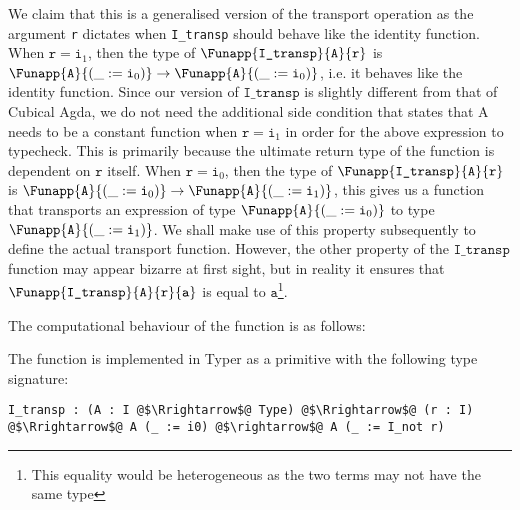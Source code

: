\documentclass[12pt,twoside,maitrise]{dms}
\theoremstyle{definition}
\numberwithin{equation}{section}
\numberwithin{table}{chapter}
\numberwithin{figure}{chapter}
\newcommand\id[1] {\texttt{#1}}
\begin{document}
We claim that this is a generalised version of the transport operation as the
argument \id{r} dictates when \id{I\_transp} should behave like the identity
function. When $\id{r} = \id{i}_1$, then the type of
$\Funapp{\id{I\_transp}}{\id{A}}{\id{r}}$ is $\Funapp{\id{A}}{(\earg{\id{i}_0})}
\rightarrow \Funapp{\id{A}}{(\earg{\id{i}_0})}$, i.e. it behaves like the
identity function. Since our version of $\id{I\_transp}$ is slightly different
from that of Cubical Agda, we do not need the additional side condition that
states that A needs to be a constant function when $\id{r} = \id{i}_1$ in order
for the above expression to typecheck. This is primarily because the ultimate
return type of the function is dependent on $\id{r}$ itself. When $\id{r} =
\id{i}_0$, then the type of $\Funapp{\id{I\_transp}}{\id{A}}{\id{r}}$ is
$\Funapp{\id{A}}{(\earg{\id{i}_0})} \rightarrow
\Funapp{\id{A}}{(\earg{\id{i}_1})}$, this gives us a function that transports an
expression of type $\Funapp{\id{A}}{(\earg{\id{i}_0})}$ to type
$\Funapp{\id{A}}{(\earg{\id{i}_1})}$. We shall make use of this property
subsequently to define the actual transport function. However, the other
property of the $\id{I\_transp}$ function may appear bizarre at first sight, but
in reality it ensures that $\Funapp{\id{I\_transp}}{\id{A}}{\id{r}}{\id{a}}$ is
equal to $\id{a}$\footnote{This equality would be heterogeneous as the two terms
may not have the same type}.

The computational behaviour of the function is as follows:

\begin{prooftree*}
  \infer0{\Funapp{\id{I\_transp}}{\id{A}}{\ileft}{\id{a}} \rightsquigarrow \id{a}}
\end{prooftree*}

\begin{prooftree*}
  \infer0{\Funapp{\id{I\_transp}}{\id{A}}{\iright}{\id{a}} \rightsquigarrow \id{a}}
\end{prooftree*}

The function is implemented in Typer as a primitive with the following type
signature:

\begin{verbatim}
I_transp : (A : I @$\Rrightarrow$@ Type) @$\Rrightarrow$@ (r : I) @$\Rrightarrow$@ A (_ := i0) @$\rightarrow$@ A (_ := I_not r)
\end{verbatim}
\end{document}
